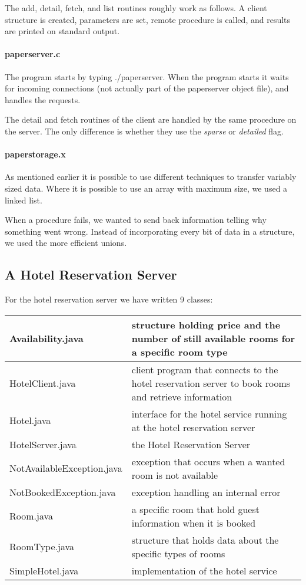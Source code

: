 \documentclass[a4paper,10pt]{article}
\begin{document}
The add, detail, fetch, and list routines roughly work as follows. A client structure is created, parameters are set, remote procedure is called, and results are printed on standard output.

\paragraph{paperserver.c}
The program starts by typing ./paperserver. When the program starts it waits for incoming connections (not actually part of the paperserver object file), and handles the requests.

The detail and fetch routines of the client are handled by the same procedure on the server. The only difference is whether they use the \emph{sparse} or \emph{detailed} flag.

\paragraph{paperstorage.x}
As mentioned earlier it is possible to use different techniques to transfer variably sized data. Where it is possible to use an array with maximum size, we used a linked list.

When a procedure fails, we wanted to send back information telling why something went wrong. Instead of incorporating every bit of data in a structure, we used the more efficient unions.

\subsection{A Hotel Reservation Server}
For the hotel reservation server we have written 9 classes:
\begin{center}
\begin{tabular}{ l | p{7.0cm} }
Availability.java & structure holding price and the number of still available rooms for a specific room type\\ \hline
HotelClient.java & client program that connects to the hotel reservation server to book rooms and retrieve information\\ \hline
Hotel.java & interface for the hotel service running at the hotel reservation server\\ \hline
HotelServer.java & the Hotel Reservation Server\\ \hline
NotAvailableException.java & exception that occurs when a wanted room is not available\\ \hline
NotBookedException.java & exception handling an internal error\\ \hline
Room.java & a specific room that hold guest information when it is booked\\ \hline
RoomType.java & structure that holds data about the specific types of rooms\\ \hline
SimpleHotel.java & implementation of the hotel service\\
\end{tabular}
\end{center}
\end{document}
